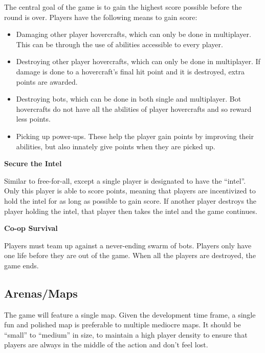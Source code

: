 \documentclass{article}
\theoremstyle{definition}
\begin{document}
The central goal of the game is to gain the highest score possible before the
round is over. Players have the following means to gain score:
\begin{itemize}
  \item Damaging other player hovercrafts, which can only be done in
    multiplayer. This can be through the use of abilities accessible to every
    player.
  \item Destroying other player hovercrafts, which can only be done in
    multiplayer. If damage is done to a hovercraft's final hit point and it is
    destroyed, extra points are awarded.
  \item Destroying bots, which can be done in both single and multiplayer.
    Bot hovercrafts do not have all the abilities of player hovercrafts and
    so reward less points.
  \item Picking up power-ups. These help the player gain points by improving
    their abilities, but also innately give points when they are picked up.
\end{itemize}

\textbf{\textbf{Secure the Intel}}

Similar to free-for-all, except a single player is designated to have the
``intel''. Only this player is able to score points, meaning that players are
incentivized to hold the intel for as long as possible to gain score. If
another player destroys the player holding the intel, that player then takes
the intel and the game continues.

\textbf{Co-op Survival}

Players must team up against a never-ending swarm of bots. Players only have
one life before they are out of the game. When all the players are destroyed,
the game ends.
\subsection{Arenas/Maps}

The game will feature a single map. Given the development time frame, a single
fun and polished map is preferable to multiple mediocre maps. It should be
``small'' to ``medium'' in size, to maintain a high player density to ensure
that players are always in the middle of the action and don't feel lost.
\end{document}
